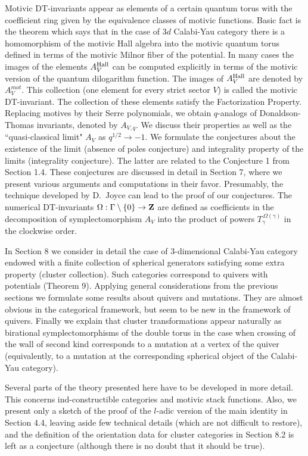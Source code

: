 \documentclass[12pt]{article}
\begin{document}
Motivic DT-invariants appear as elements of a certain quantum torus with the coefficient ring given by the equivalence classes of motivic functions. Basic fact is the theorem which says that
in the case of $3d$ Calabi-Yau category there is a homomorphism of the motivic Hall algebra into the motivic quantum torus defined in terms of the motivic Milnor fiber of the potential. In many cases the images of the elements $A_V^{\operatorname{Hall}}$ can be computed explicitly in terms of the motivic version of the quantum dilogarithm function.
The images of $A_V^{\operatorname{Hall}}$ are denoted by $A_{V}^{mot}$. This collection (one element for every strict sector $V$)
is called the motivic DT-invariant. The collection of these elements satisfy the Factorization Property. Replacing motives  by their Serre polynomials,
 we obtain $q$-analogs
of Donaldson-Thomas invariants,  denoted by $A_{V,q}$. We discuss their properties as well as the ``quasi-classical limit"  $A_V$ as $q^{1/2}\to -1$. We formulate the conjectures about the existence of the limit (absence of poles conjecture) and integrality property of the limits (integrality conjecture). The latter are related to the Conjecture 1 from Section 1.4. These conjectures are discussed in detail in Section 7, where we present various arguments and computations in their favor. Presumably, the technique developed by D.~Joyce  can lead to the proof
of  our conjectures. The numerical DT-invariants $\Omega:\Gamma\setminus\{0\}\to {\bf Z}$ are defined as coefficients in the decomposition of symplectomorphism $A_V$ into the product of powers $T_{\gamma}^{\,\Omega(\gamma)}$ in the clockwise order.

In Section 8 we consider in detail the case of $3$-dimensional Calabi-Yau category endowed with a finite
collection of spherical generators satisfying some extra property (cluster collection). Such categories correspond to quivers with potentials (Theorem 9).
Applying general considerations from the previous sections we formulate some results about quivers
and mutations. They are almost obvious in the categorical framework, but seem to be new in the framework
of quivers. Finally we explain that cluster transformations appear naturally as birational
symplectomorphisms of the double torus in the case when crossing of the wall of second kind corresponds to
a mutation at a vertex of the quiver (equivalently, to a mutation at the corresponding
spherical object of the Calabi-Yau category).


Several parts of the theory presented here have to be developed in more detail. This concerns  ind-constructible categories
 and motivic stack functions. Also, we present only a sketch of the proof of the $l$-adic version of the main identity in Section 4.4, leaving aside few 
technical details (which are not difficult to restore), and   the definition of the orientation data
 for cluster categories in Section 8.2 is left as a conjecture (although there is no doubt that it should be true).
\end{document}
